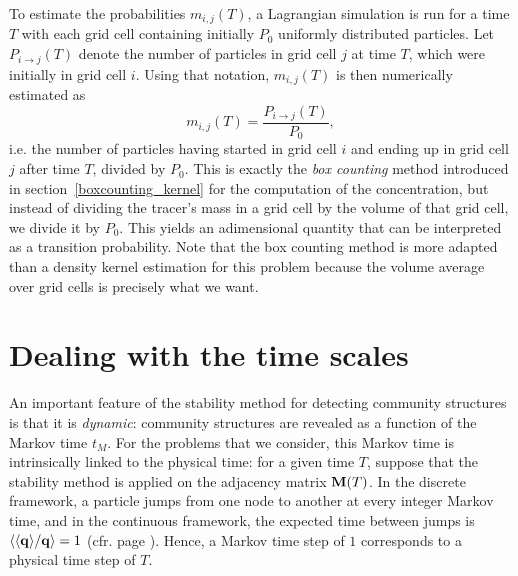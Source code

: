 To estimate the probabilities $m_{i,j}(T)$, a Lagrangian simulation is run for a time $T$ with each grid cell containing initially $P_0$ uniformly distributed particles. Let $P_{i \rightarrow j}(T)$ denote the number of particles in grid cell $j$ at time $T$, which were initially in grid cell $i$. Using that notation, $m_{i,j}(T)$ is then numerically estimated as 
\begin{equation}
	m_{i,j}(T) = \frac{P_{i \rightarrow j}(T)}{P_0},
\end{equation}
i.e. the number of particles having started in grid cell $i$ and ending up in grid cell $j$ after time $T$, divided by $P_0$. This is exactly the \textit{box counting} method introduced in section~\ref{boxcounting_kernel} for the computation of the concentration, but instead of dividing the tracer's mass in a grid cell by the volume of that grid cell, we divide it by $P_0$. This yields an adimensional quantity that can be interpreted as a transition probability. Note that the box counting method is more adapted than a density kernel estimation for this problem because the volume average over grid cells is precisely what we want.

\section{Dealing with the time scales} \label{sec:timescales}
An important feature of the stability method for detecting community structures is that it is \textit{dynamic}: community structures are revealed as a function of the Markov time $t_M$. For the problems that we consider, this Markov time is intrinsically linked to the physical time: for a given time $T$, suppose that the stability method is applied on the adjacency matrix $\mathbf M(T)$. In the discrete framework, a particle jumps from one node to another at every integer Markov time, and in the continuous framework, the expected time between jumps is $\langle \langle \mathbf q \rangle/\mathbf q \rangle = 1$ (cfr. page \pageref{expectedtimebetweenjumps}). Hence, a Markov time step of $1$ corresponds to a physical time step of $T$.

